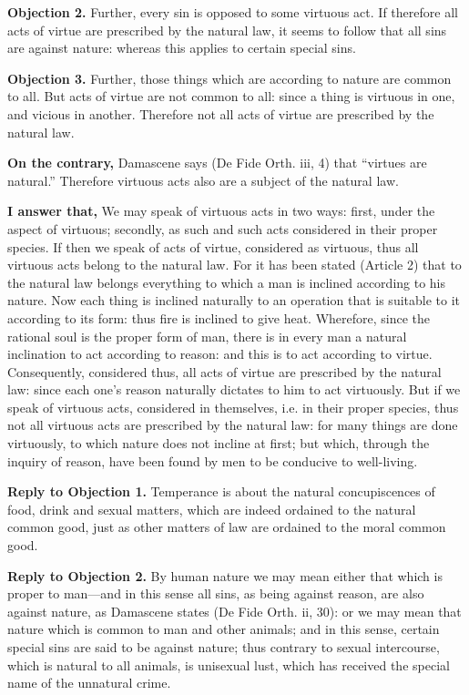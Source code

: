 \textbf{Objection 2.} Further, every sin is opposed to some virtuous act. If therefore all acts of virtue are prescribed by the natural law, it seems to follow that all sins are against nature: whereas this applies to certain special sins.

\textbf{Objection 3.} Further, those things which are according to nature are common to all. But acts of virtue are not common to all: since a thing is virtuous in one, and vicious in another. Therefore not all acts of virtue are prescribed by the natural law.

\textbf{On the contrary,} Damascene says (De Fide Orth. iii, 4) that ``virtues are natural.'' Therefore virtuous acts also are a subject of the natural law.

\textbf{I answer that,} We may speak of virtuous acts in two ways: first, under the aspect of virtuous; secondly, as such and such acts considered in their proper species. If then we speak of acts of virtue, considered as virtuous, thus all virtuous acts belong to the natural law. For it has been stated (Article 2) that to the natural law belongs everything to which a man is inclined according to his nature. Now each thing is inclined naturally to an operation that is suitable to it according to its form: thus fire is inclined to give heat. Wherefore, since the rational soul is the proper form of man, there is in every man a natural inclination to act according to reason: and this is to act according to virtue. Consequently, considered thus, all acts of virtue are prescribed by the natural law: since each one's reason naturally dictates to him to act virtuously. But if we speak of virtuous acts, considered in themselves, i.e. in their proper species, thus not all virtuous acts are prescribed by the natural law: for many things are done virtuously, to which nature does not incline at first; but which, through the inquiry of reason, have been found by men to be conducive to well-living.

\textbf{Reply to Objection 1.} Temperance is about the natural concupiscences of food, drink and sexual matters, which are indeed ordained to the natural common good, just as other matters of law are ordained to the moral common good.

\textbf{Reply to Objection 2.} By human nature we may mean either that which is proper to man—and in this sense all sins, as being against reason, are also against nature, as Damascene states (De Fide Orth. ii, 30): or we may mean that nature which is common to man and other animals; and in this sense, certain special sins are said to be against nature; thus contrary to sexual intercourse, which is natural to all animals, is unisexual lust, which has received the special name of the unnatural crime.

